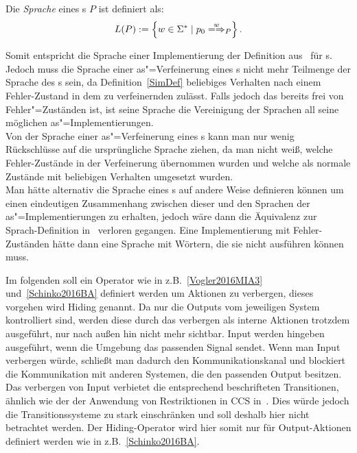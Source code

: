 \vspace{0.2cm}

\begin{Def}[Sprache]
  \label{LDef}
  Die \emph{Sprache} eines \MEIO{}s $P$ ist definiert als:
  \[L(P) := \left\{w\in \Sigma ^* \mid p_0\weakmay[w]_P \right\}.\]
\end{Def}

Somit entspricht die Sprache einer Implementierung der Definition
aus~\cite{Schinko2016BA} für \EIO{}s. Jedoch muss die Sprache einer
as"=Verfeinerung eines \MEIO{}s nicht mehr Teilmenge der Sprache des \MEIO{}s
sein, da Definition~\ref{SimDef} beliebiges Verhalten nach einem Fehler-Zustand
in dem zu verfeinernden \MEIO{} zulässt. Falls jedoch das \MEIO{} bereits frei
von Fehler"=Zuständen ist, ist seine Sprache die Vereinigung der Sprachen all
seine möglichen as"=Implementierungen.\\
Von der Sprache einer as"=Verfeinerung eines \MEIO{}s kann man nur wenig
Rückschlüsse auf die ursprüngliche Sprache ziehen, da man nicht weiß,
welche Fehler-Zustände in der Verfeinerung übernommen wurden und welche als
normale Zustände mit beliebigen Verhalten umgesetzt wurden.\\
Man hätte alternativ die Sprache eines \MEIO{}s auf andere Weise definieren
können um einen eindeutigen Zusammenhang zwischen dieser und den Sprachen der
as"=Implementierungen zu erhalten, jedoch wäre dann die Äquivalenz zur \EIO{}
Sprach-Definition in~\cite{Schinko2016BA} verloren gegangen. Eine
Implementierung mit Fehler-Zuständen hätte dann eine Sprache mit Wörtern, die
sie nicht ausführen können muss.

Im folgenden soll ein Operator wie in z.B.~\ref{Vogler2016MIA3}
und~\ref{Schinko2016BA} definiert werden um Aktionen zu verbergen, dieses
vorgehen wird Hiding genannt. Da nur die Outputs vom jeweiligen System
kontrolliert sind, werden diese durch das verbergen als interne Aktionen
trotzdem ausgeführt, nur nach außen hin nicht mehr sichtbar. Input werden
hingeben ausgeführt, wenn die Umgebung das passenden Signal sendet. Wenn man
Input verbergen würde, schließt man dadurch den Kommunikationskanal und
blockiert die Kommunikation mit anderen Systemen, die den passenden Output
besitzen. Das verbergen von Input verbietet die entsprechend beschrifteten
Transitionen, ähnlich wie der der Anwendung von Restriktionen in CCS
in~\cite{Milner1989}. Dies würde jedoch die Transitionssysteme zu stark
einschränken und soll deshalb hier nicht betrachtet werden. Der Hiding-Operator
wird hier somit nur für Output-Aktionen definiert werden wie in
z.B.~\ref{Schinko2016BA}.

